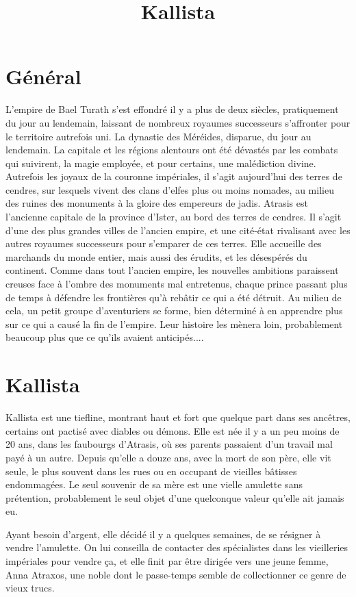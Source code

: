 \documentclass[10pt,a4paper]{article}
\author{ }
\title{Kallista}
\author{}
\date{}
\begin{document}
\maketitle
\section{Général}
L'empire de Bael Turath s'est effondré il y a plus de deux siècles, pratiquement du jour au lendemain, laissant de nombreux royaumes successeurs s'affronter pour le territoire autrefois uni. La dynastie des Méréides, disparue, du jour au lendemain. La capitale et les régions alentours ont été dévastés par les combats qui suivirent, la magie employée, et pour certains, une malédiction divine. Autrefois les joyaux de la couronne impériales, il s'agit aujourd'hui des terres de cendres, sur lesquels vivent des clans d'elfes plus ou moins nomades, au milieu des ruines des monuments à la gloire des empereurs de jadis.
Atrasis est l'ancienne capitale de la province d'Ister, au bord des terres de cendres. Il s'agit d'une des plus grandes villes de l'ancien empire, et une cité-état rivalisant avec les autres royaumes successeurs pour s'emparer de ces terres. Elle accueille des marchands du monde entier, mais aussi des érudits, et les désespérés du continent.
Comme dans tout l'ancien empire, les nouvelles ambitions paraissent creuses face à l'ombre des monuments mal entretenus, chaque prince passant plus de temps à défendre les frontières qu'à rebâtir ce qui a été détruit.
Au milieu de cela, un petit groupe d'aventuriers se forme, bien déterminé à en apprendre plus sur ce qui a causé la fin de l'empire. Leur histoire les mènera loin, probablement beaucoup plus que ce qu'ils avaient anticipés....
\section{Kallista}
Kallista est une tiefline, montrant haut et fort que quelque part dans ses ancêtres, certains ont pactisé avec diables ou démons. Elle est née il y a un peu moins de 20 ans, dans les faubourgs d'Atrasis, où ses parents passaient d'un travail mal payé à un autre. Depuis qu'elle a douze ans, avec la mort de son père, elle vit seule, le plus souvent dans les rues ou en occupant de vieilles bâtisses endommagées. Le seul souvenir de sa mère est une vielle amulette sans prétention, probablement le seul objet d'une quelconque valeur qu'elle ait jamais eu.

Ayant besoin d'argent, elle décidé il y a quelques semaines, de se résigner à vendre l'amulette. On lui conseilla de contacter des spécialistes dans les vieilleries impériales pour vendre ça, et elle finit par être dirigée vers une jeune femme, Anna Atraxos, une noble dont le passe-temps semble de collectionner ce genre de vieux trucs.
\end{document}
